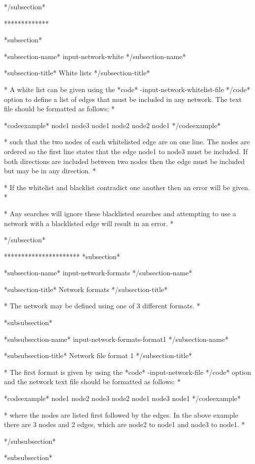 */subsection*

*************

*subsection*

*subsection-name* input-network-white */subsection-name*

*subsection-title* White lists */subsection-title*

* A white list can be given using the *code* -input-network-whitelist-file */code* option to define a list of edges that must be included in any network. The text file should be formatted as follows: *

*codeexample* node1 node3 node1 node2 node2 node1 */codeexample*

* such that the two nodes of each whitelisted edge are on one line. The nodes are ordered so the first line states that the edge node1 to node3 must be included. If both directions are included between two nodes then the edge must be included but may be in any direction. *

* If the whitelist and blacklist contradict one another then an error will be given. *

* Any searches will ignore these blacklisted searches and attempting to use a network with a blacklisted edge will result in an error. *

*/subsection*

********************** *subsection*

*subsection-name* input-network-formats */subsection-name*

*subsection-title* Network formats */subsection-title*

* The network may be defined using one of 3 different formats. *


*subsubsection*

*subsubsection-name* input-network-formats-format1 */subsection-name*

*subsubsection-title* Network file format 1 */subsection-title*

* The first format is given by using the *code* -input-network-file */code* option and the network text file should be formatted as follows: *

*codeexample* node1 node2 node3 node2 node1 node3 node1 */codeexample*

* where the nodes are listed first followed by the edges. In the above example there are 3 nodes and 2 edges, which are node2 to node1 and node3 to node1. *

*/subsubsection*


*subsubsection*

